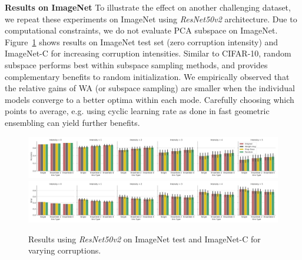 \documentclass{article}
\newcommand{\reducespaceafterfigure}{\vspace{-1em}} %
\begin{document}
 \textbf{Results on ImageNet} 
To illustrate the effect on another challenging dataset, we repeat these experiments on ImageNet \citep{imagenet_cvpr09} using \emph{ResNet50v2} architecture. Due to computational constraints, we do not evaluate PCA subspace on ImageNet.  %
%
%
Figure~\ref{fig:imagenet:acc-brier:clean-corruptions} shows results on ImageNet test set (zero corruption intensity) and ImageNet-C for increasing corruption intensities.  Similar to CIFAR-10, random subspace performs best within subspace sampling methods, and provides complementary benefits to random initialization.  
We empirically observed that the relative gains of WA (or subspace sampling) are smaller when the individual models 
converge to a better optima within each mode. Carefully choosing which points to average, e.g. using cyclic learning rate as done in fast geometric ensembling \citep{garipov2018loss} can yield further benefits.
%
%
%
%




%

%
%
 









%
%
%
%
%
%
%
%
%
%
%
%
%
%
%
%
%
%
%
%
%

\begin{figure}[ht]%
    \centering%

\includegraphics[width=1.0\linewidth]{figures/imagenet_c_barplot_acc.png}\\
    
\includegraphics[width=1.0\linewidth]{figures/imagenet_c_barplot_brier.png}
  \reducespaceafterfigure %
  \reducespaceafterfigure
    \caption{Results using \emph{ResNet50v2} on ImageNet   test and ImageNet-C for varying corruptions. %
    }
    \label{fig:imagenet:acc-brier:clean-corruptions}%
\end{figure}%

%
%
%
%
%
%
%
%
%
%
%
%
%
%
%
%
%
%
%
%
%
%
%
%
\end{document}
